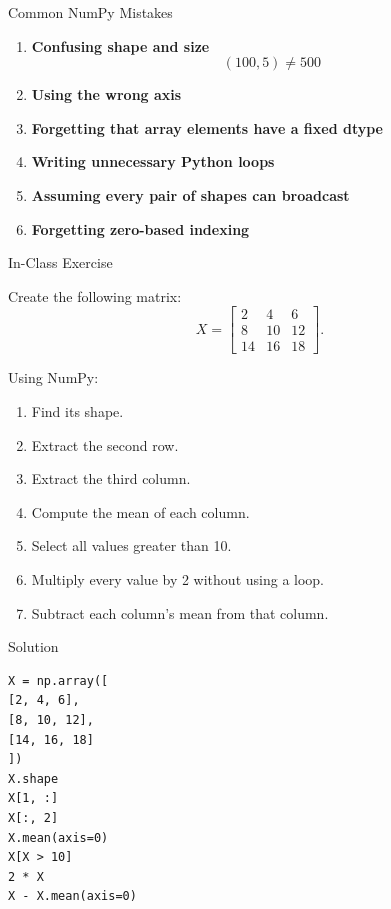 \documentclass[11pt,aspectratio=43]{beamer}
\begin{document}
\begin{frame}{Common NumPy Mistakes}

\begin{enumerate}

\item \textbf{Confusing shape and size}
\[
(100,5)\neq500
\]

\item \textbf{Using the wrong axis}

\item \textbf{Forgetting that array elements have a fixed dtype}

\item \textbf{Writing unnecessary Python loops}

\item \textbf{Assuming every pair of shapes can broadcast}

\item \textbf{Forgetting zero-based indexing}

\end{enumerate}

\end{frame}

\begin{frame}[fragile]{In-Class Exercise}

Create the following matrix:
\[
X =
\begin{bmatrix}
2&4&6\\
8&10&12\\
14&16&18
\end{bmatrix}.
\]

Using NumPy:

\begin{enumerate}
\item Find its shape.
\item Extract the second row.
\item Extract the third column.
\item Compute the mean of each column.
\item Select all values greater than 10.
\item Multiply every value by 2 without using a loop.
\item Subtract each column's mean from that column.
\end{enumerate}

\end{frame}

\begin{frame}[fragile]{Solution}

\begin{lstlisting}
X = np.array([
[2, 4, 6],
[8, 10, 12],
[14, 16, 18]
])
X.shape
X[1, :]
X[:, 2]
X.mean(axis=0)
X[X > 10]
2 * X
X - X.mean(axis=0)
\end{lstlisting}

\end{frame}
\end{document}
